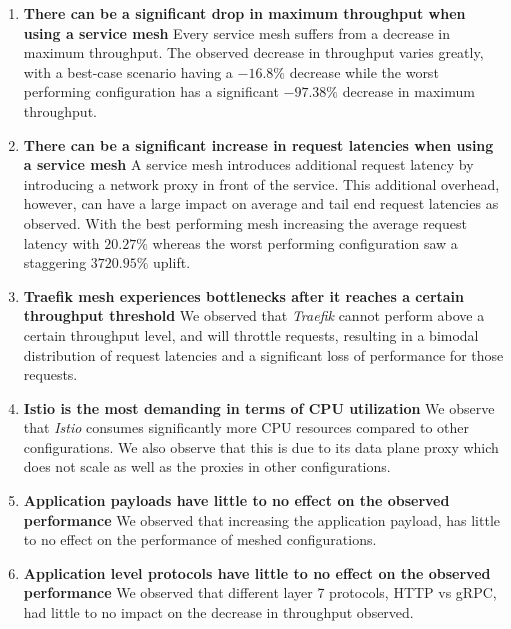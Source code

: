 \begin{enumerate}[label=\textbf{MF\arabic*}, leftmargin=3\parindent]
    \item \textbf{There can be a significant drop in maximum throughput when using a service mesh}
    \label{exp:mf1}
    Every service mesh suffers from a decrease in maximum throughput. The observed decrease in throughput varies greatly, with a best-case scenario having a  $-16.8\%$ decrease while the worst performing configuration has a significant  $-97.38\%$ decrease in maximum throughput.
    
    \item \textbf{There can be a significant increase in request latencies when using a service mesh}
    \label{exp:mf2}
    A service mesh introduces additional request latency by introducing a network proxy in front of the service. This additional overhead, however, can have a large impact on average and tail end request latencies as observed. With the best performing mesh increasing the average request latency with $20.27\%$ whereas the worst performing configuration saw a staggering $3720.95\%$ uplift.
    
    \item \textbf{Traefik mesh experiences bottlenecks after it reaches a certain throughput threshold}
    \label{exp:mf3}
    We observed that \textit{Traefik} cannot perform above a certain throughput level, and will throttle requests, resulting in a bimodal distribution of request latencies and a significant loss of performance for those requests.
    
    \item \textbf{Istio is the most demanding in terms of CPU utilization}
    \label{exp:mf4}
    We observe that \textit{Istio} consumes significantly more CPU resources compared to other configurations. We also observe that this is due to its data plane proxy which does not scale as well as the proxies in other configurations.
    
    \item \textbf{Application payloads have little to no effect on the observed performance}
    \label{exp:mf5}
    We observed that increasing the application payload, has little to no effect on the performance of meshed configurations.
    
    \item \textbf{Application level protocols have little to no effect on the observed performance}
    \label{exp:mf6}
    We observed that different layer 7 protocols, HTTP vs gRPC, had little to no impact on the decrease in throughput observed.
    

\end{enumerate}
